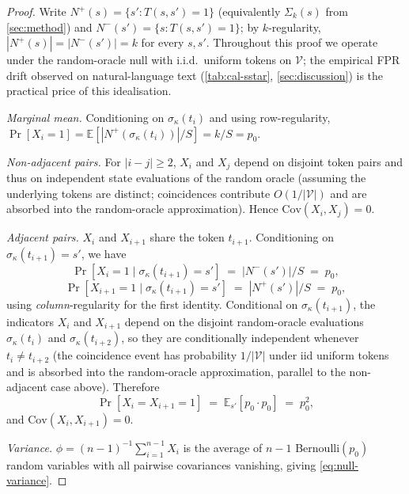 \begin{proof}
  Write $N^+(s) = \{s' : T(s,s')=1\}$ (equivalently $\Sigma_k(s)$
  from \autoref{sec:method}) and $N^-(s') = \{s : T(s,s')=1\}$;
  by $k$-regularity, $|N^+(s)| = |N^-(s')| = k$ for every $s, s'$.
  Throughout this proof we operate under the random-oracle null with
  i.i.d.\ uniform tokens on $\mathcal V$; the empirical FPR drift
  observed on natural-language text (\autoref{tab:cal-sstar},
  \autoref{sec:discussion}) is the practical price of this
  idealisation.

  \emph{Marginal mean.}  Conditioning on $\sigma_\kappa(t_i)$ and using
  row-regularity,
  \(
    \Pr[X_i = 1]
      = \mathbb{E}\!\left[ |N^+(\sigma_\kappa(t_i))| / S \right]
      = k/S = p_0.
  \)

  \emph{Non-adjacent pairs.}  For $|i-j| \geq 2$, $X_i$ and $X_j$
  depend on disjoint token pairs and thus on independent state
  evaluations of the random oracle (assuming the underlying tokens
  are distinct; coincidences contribute $O(1/|\mathcal{V}|)$ and are
  absorbed into the random-oracle approximation).  Hence
  $\mathrm{Cov}(X_i, X_j) = 0$.

  \emph{Adjacent pairs.}  $X_i$ and $X_{i+1}$ share the token
  $t_{i+1}$.  Conditioning on $\sigma_\kappa(t_{i+1}) = s'$, we have
  \[
    \Pr[X_i = 1 \mid \sigma_\kappa(t_{i+1}) = s']
      \;=\; |N^-(s')| / S \;=\; p_0,
  \]
  \[
    \Pr[X_{i+1} = 1 \mid \sigma_\kappa(t_{i+1}) = s']
      \;=\; |N^+(s')| / S \;=\; p_0,
  \]
  using \emph{column}-regularity for the first identity.  Conditional
  on $\sigma_\kappa(t_{i+1})$, the indicators $X_i$ and $X_{i+1}$ depend
  on the disjoint random-oracle evaluations $\sigma_\kappa(t_i)$ and
  $\sigma_\kappa(t_{i+2})$, so they are conditionally independent
  whenever $t_i \neq t_{i+2}$ (the coincidence event has
  probability $1/|\mathcal{V}|$ under iid uniform tokens and is
  absorbed into the random-oracle approximation, parallel to the
  non-adjacent case above).  Therefore
  \[
    \Pr[X_i = X_{i+1} = 1]
      \;=\; \mathbb{E}_{s'}\!\left[ p_0 \cdot p_0 \right]
      \;=\; p_0^2,
  \]
  and $\mathrm{Cov}(X_i, X_{i+1}) = 0$.

  \emph{Variance.}  $\phi = (n-1)^{-1} \sum_{i=1}^{n-1} X_i$ is the
  average of $n-1$ Bernoulli$(p_0)$ random variables with all
  pairwise covariances vanishing, giving \eqref{eq:null-variance}.
\end{proof}


